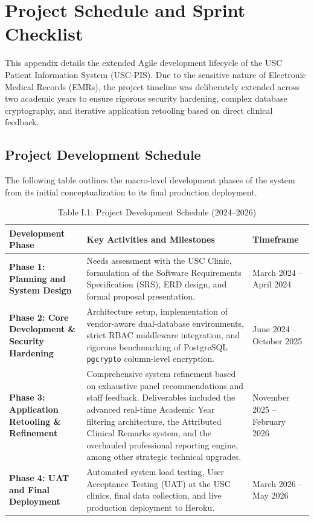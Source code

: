 
\chapter{Project Schedule and Sprint Checklist}
\label{appendix:project_schedule}

This appendix details the extended Agile development lifecycle of the USC Patient Information System (USC-PIS). Due to the sensitive nature of Electronic Medical Records (EMRs), the project timeline was deliberately extended across two academic years to ensure rigorous security hardening, complex database cryptography, and iterative application retooling based on direct clinical feedback.

\section{Project Development Schedule}
The following table outlines the macro-level development phases of the system from its initial conceptualization to its final production deployment.

\begin{table}[htbp]
\centering
\caption*{Table I.1: Project Development Schedule (2024--2026)}
\begin{tabular}{|p{3cm}|p{8cm}|p{3cm}|}
\hline
\textbf{Development Phase} & \textbf{Key Activities and Milestones} & \textbf{Timeframe} \\
\hline
\textbf{Phase 1: Planning and System Design} & Needs assessment with the USC Clinic, formulation of the Software Requirements Specification (SRS), ERD design, and formal proposal presentation. & March 2024 -- April 2024 \\
\hline
\textbf{Phase 2: Core Development \& Security Hardening} & Architecture setup, implementation of vendor-aware dual-database environments, strict RBAC middleware integration, and rigorous benchmarking of PostgreSQL \texttt{pgcrypto} column-level encryption. & June 2024 -- October 2025 \\
\hline
\textbf{Phase 3: Application Retooling \& Refinement} & Comprehensive system refinement based on exhaustive panel recommendations and staff feedback. Deliverables included the advanced real-time Academic Year filtering architecture, the Attributed Clinical Remarks system, and the overhauled professional reporting engine, among other strategic technical upgrades. & November 2025 -- February 2026 \\
\hline
\textbf{Phase 4: UAT and Final Deployment} & Automated system load testing, User Acceptance Testing (UAT) at the USC clinics, final data collection, and live production deployment to Heroku. & March 2026 -- May 2026 \\
\hline
\end{tabular}
\end{table}

